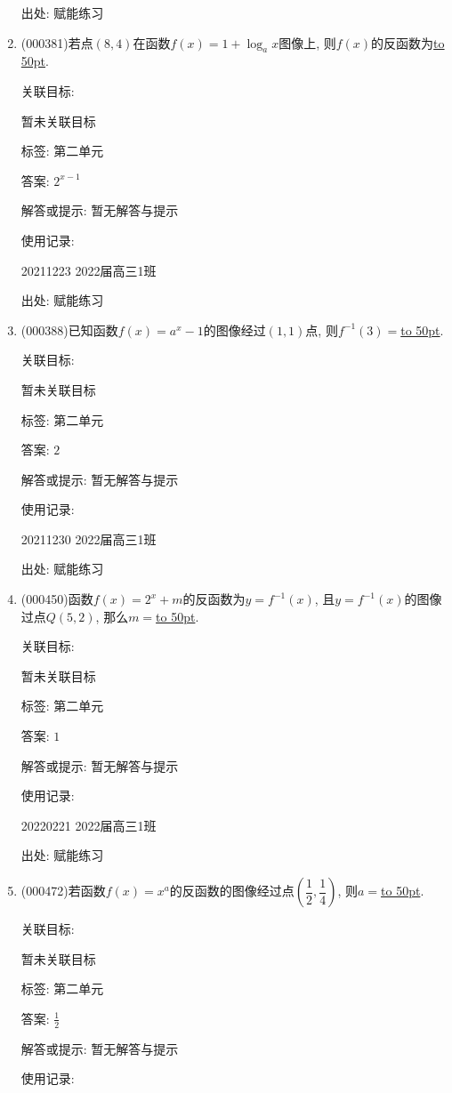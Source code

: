 \documentclass[10pt,a4paper]{article}
\newcommand{\blank}[1]{\underline{\hbox to #1pt{}}}
\begin{document}
\begin{enumerate}[1.]
出处: 赋能练习
\item { (000381)}若点$(8,4)$在函数$f(x)=1+\log_a x$图像上, 则$f(x)$的反函数为\blank{50}.


关联目标:

暂未关联目标



标签: 第二单元

答案: $2^{x-1}$

解答或提示: 暂无解答与提示

使用记录:

20211223	2022届高三1班	


出处: 赋能练习
\item { (000388)}已知函数$f(x)=a^x-1$的图像经过$(1,1)$点, 则$f^{-1}(3)=$\blank{50}.


关联目标:

暂未关联目标



标签: 第二单元

答案: $2$

解答或提示: 暂无解答与提示

使用记录:

20211230	2022届高三1班	


出处: 赋能练习
\item { (000450)}函数$f(x)=2^x+m$的反函数为$y=f^{-1}(x)$, 且$y=f^{-1}(x)$的图像过点$Q(5,2)$, 那么$m=$\blank{50}.


关联目标:

暂未关联目标



标签: 第二单元

答案: $1$

解答或提示: 暂无解答与提示

使用记录:

20220221	2022届高三1班	


出处: 赋能练习
\item { (000472)}若函数$f(x)=x^a$的反函数的图像经过点$(\dfrac12,\dfrac14)$, 则$a=$\blank{50}.


关联目标:

暂未关联目标



标签: 第二单元

答案: $\frac 12$

解答或提示: 暂无解答与提示

使用记录:


\end{enumerate}
\end{document}
